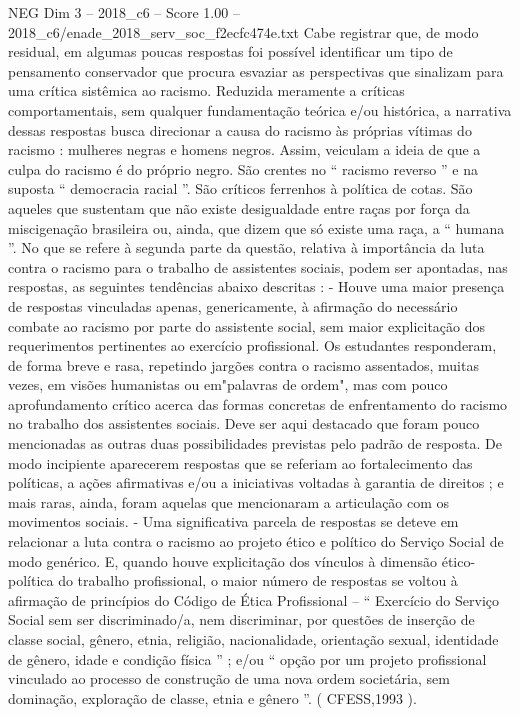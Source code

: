 \begin{textsample}{NEG Dim 3 – 2018\_c6 – Score 1.00 – 2018\_c6/enade\_2018\_serv\_soc\_f2ecfc474e.txt}
Cabe registrar que, de modo residual, em algumas poucas respostas foi possível identificar um tipo de pensamento conservador que procura esvaziar as perspectivas que sinalizam para uma crítica sistêmica ao racismo.
Reduzida meramente a críticas comportamentais, sem qualquer fundamentação teórica e/ou histórica, a narrativa dessas respostas busca direcionar a causa do racismo às próprias vítimas do racismo : mulheres negras e homens negros.
Assim, veiculam a ideia de que a culpa do racismo é do próprio negro.
São crentes no “ racismo reverso ” e na suposta “ democracia racial ”.
São críticos ferrenhos à política de cotas.
São aqueles que sustentam que não existe desigualdade entre raças por força da miscigenação brasileira ou, ainda, que dizem que só existe uma raça, a “ humana ”.
No que se refere à segunda parte da questão, relativa à importância da luta contra o racismo para o trabalho de assistentes sociais, podem ser apontadas, nas respostas, as seguintes tendências abaixo descritas : - Houve uma maior presença de respostas vinculadas apenas, genericamente, à afirmação do necessário combate ao racismo por parte do assistente social, sem maior explicitação dos requerimentos pertinentes ao exercício profissional.
Os estudantes responderam, de forma breve e rasa, repetindo jargões contra o racismo assentados, muitas vezes, em visões humanistas ou em"palavras de ordem", mas com pouco aprofundamento crítico acerca das formas concretas de enfrentamento do racismo no trabalho dos assistentes sociais.
Deve ser aqui destacado que foram pouco mencionadas as outras duas possibilidades previstas pelo padrão de resposta.
De modo incipiente aparecerem respostas que se referiam ao fortalecimento das políticas, a ações afirmativas e/ou a iniciativas voltadas à garantia de direitos ; e mais raras, ainda, foram aquelas que mencionaram a articulação com os movimentos sociais. - Uma significativa parcela de respostas se deteve em relacionar a luta contra o racismo ao projeto ético e político do Serviço Social de modo genérico.
E, quando houve explicitação dos vínculos à dimensão ético-política do trabalho profissional, o maior número de respostas se voltou à afirmação de princípios do Código de Ética Profissional – “ Exercício do Serviço Social sem ser discriminado/a, nem discriminar, por questões de inserção de classe social, gênero, etnia, religião, nacionalidade, orientação sexual, identidade de gênero, idade e condição física ” ; e/ou “ opção por um projeto profissional vinculado ao processo de construção de uma nova ordem societária, sem dominação, exploração de classe, etnia e gênero ”. ( CFESS,1993 ).

\end{textsample}
